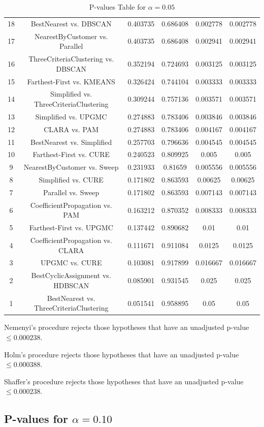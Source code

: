 \documentclass[a4paper,10pt]{article}
\begin{document}
\begin{landscape}
\begin{table}[!htp]
\begin{tabular}{cccccc}
18&BestNearest vs. DBSCAN&0.403735&0.686408&0.002778&0.002778\\
17&NearestByCustomer vs. Parallel&0.403735&0.686408&0.002941&0.002941\\
16&ThreeCriteriaClustering vs. DBSCAN&0.352194&0.724693&0.003125&0.003125\\
15&Farthest-First vs. KMEANS&0.326424&0.744104&0.003333&0.003333\\
14&Simplified vs. ThreeCriteriaClustering&0.309244&0.757136&0.003571&0.003571\\
13&Simplified vs. UPGMC&0.274883&0.783406&0.003846&0.003846\\
12&CLARA vs. PAM&0.274883&0.783406&0.004167&0.004167\\
11&BestNearest vs. Simplified&0.257703&0.796636&0.004545&0.004545\\
10&Farthest-First vs. CURE&0.240523&0.809925&0.005&0.005\\
9&NearestByCustomer vs. Sweep&0.231933&0.81659&0.005556&0.005556\\
8&Simplified vs. CURE&0.171802&0.863593&0.00625&0.00625\\
7&Parallel vs. Sweep&0.171802&0.863593&0.007143&0.007143\\
6&CoefficientPropagation vs. PAM&0.163212&0.870352&0.008333&0.008333\\
5&Farthest-First vs. UPGMC&0.137442&0.890682&0.01&0.01\\
4&CoefficientPropagation vs. CLARA&0.111671&0.911084&0.0125&0.0125\\
3&UPGMC vs. CURE&0.103081&0.917899&0.016667&0.016667\\
2&BestCyclicAssignment vs. HDBSCAN&0.085901&0.931545&0.025&0.025\\
1&BestNearest vs. ThreeCriteriaClustering&0.051541&0.958895&0.05&0.05\\
\hline
\end{tabular}
\caption{P-values Table for $\alpha=0.05$}
\end{table}Nemenyi's procedure rejects those hypotheses that have an unadjusted p-value $\le0.000238$.

Holm's procedure rejects those hypotheses that have an unadjusted p-value $\le0.000388$.

Shaffer's procedure rejects those hypotheses that have an unadjusted p-value $\le0.000238$.

\pagebreak

\subsection{P-values for $\alpha=0.10$}


\end{landscape}
\end{document}
